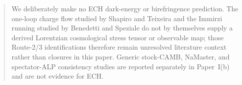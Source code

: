 \documentclass[aps,prd,twocolumn,superscriptaddress,showpacs,preprintnumbers,nofootinbib,longbibliography,floatfix]{revtex4-2}
\begin{document}
\begin{abstract}
We deliberately make no ECH dark-energy or birefringence prediction.  The
one-loop charge flow studied by Shapiro and Teixeira and the Immirzi running
studied by Benedetti and Speziale do not by themselves supply a derived
Lorentzian cosmological stress tensor or observable map; those Route-2/3
identifications therefore remain unresolved literature context rather than
closures in this paper.  Generic stock-CAMB, NaMaster, and spectator-ALP
consistency studies are reported separately in Paper~I(b) and are not evidence
for ECH.
\end{abstract}

\end{document}
